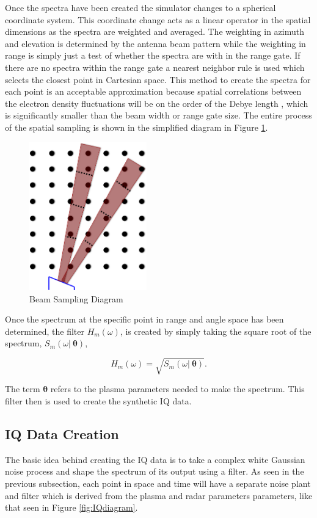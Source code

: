 \documentclass[draft,ras]{agutex}
\begin{document}
\begin{article}
Once the spectra have been created the simulator changes to a spherical coordinate system. This coordinate change acts as a linear operator in the spatial dimensions as the spectra are weighted and averaged. The weighting in azimuth and elevation is determined by the antenna beam pattern while the weighting in range is simply just a test of whether the spectra are with in the range gate. If there are no spectra within the range gate a nearest neighbor rule is used which selects the closest point in Cartesian space. This method to create the spectra for each point is an acceptable approximation because spatial correlations between the electron density fluctuations will be on the order of the Debye length \citep{farley1969}, which is significantly smaller than the beam width or range gate size. The entire process of the spatial sampling is shown in the simplified diagram in Figure \ref{fig:beamdia}.

\begin{figure}[!t]
\centering
\includegraphics[width=2in]{beamsampling}
\caption{Beam Sampling Diagram}
\label{fig:beamdia}
\end{figure}
 
Once the spectrum at the specific point in range and angle space has been determined, the filter $H_m(\omega)$, is created by simply taking the square root of the spectrum, $S_m(\omega | \: \bm{\theta})$,

\begin{equation}
\label{eq1}
H_m(\omega) = \sqrt{S_m(\omega | \: \bm{\theta})}.
\end{equation}

\noindent The term $ \bm{\theta}$ refers to the plasma parameters needed to make the spectrum. This filter then is used to create the synthetic IQ data.

\subsection{ IQ Data Creation}
The basic idea behind creating the IQ data is to take a complex white Gaussian noise process and shape the spectrum of its output using a filter. As seen in the previous subsection, each point in space and time will have a separate noise plant and filter which is derived from the plasma and radar parameters parameters, like that seen in Figure \ref{fig:IQdiagram}. 


\end{article}
\end{document}

